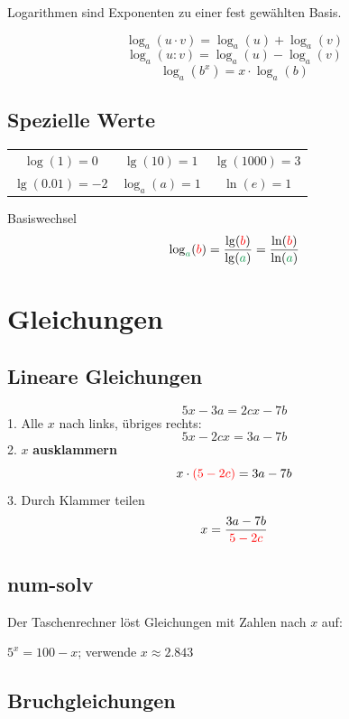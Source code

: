 \begin{multicols}{2}
Logarithmen sind Exponenten zu einer fest gewählten Basis.

\begin{gesetz*}{}{}
$$\log_a(u\cdot v) = \log_a(u) + \log_a(v)$$
$$\log_a(u : v) = \log_a(u) - \log_a(v)$$
$$\log_a(b^x) = x\cdot{}\log_a(b)$$
\end{gesetz*}

\subsection*{Spezielle Werte}
\begin{tabular}{ccc}
$\log(1)=0$     &    $\lg(10) = 1$ & $\lg(1000)=3$           \\
$\lg(0.01)=-2$ & $\log_a(a) = 1$   & $\ln(e) = 1$\\
\end{tabular}
\begin{gesetz*}{Basiswechsel}{}
$$\log_{\color{ForestGreen}a}({\color{red}b}) = \frac{\lg({\color{red}b})}{\lg({\color{ForestGreen}a})} = \frac{\ln({\color{red}b})}{\ln({\color{ForestGreen}a})}$$
\end{gesetz*}
\hrulefill
\section*{Gleichungen}

\subsection*{Lineare Gleichungen}
$$5x-3a = 2cx-7b$$
1. Alle $x$ nach links, übriges rechts:
$$5x - 2cx = 3a-7b$$
2. $x$ \textbf{\color{red}ausklammern}
$$x\cdot{}{\color{red}(5-2c)} = 3a-7b$$
3. Durch Klammer teilen
$$x = \frac{3a-7b}{{\color{red}5-2c}}$$


\subsection*{num-solv}
Der Taschenrechner löst Gleichungen mit Zahlen nach $x$ auf:

$5^x = 100 -x$; verwende  $x\approx{}2.843$



\subsection*{Bruchgleichungen}


\end{multicols}
